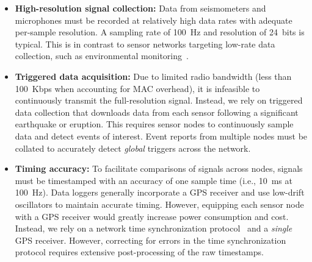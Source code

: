 \begin{itemize}

\item \textbf{High-resolution signal collection:} Data from seismometers and
microphones must be recorded at relatively high data rates with adequate
per-sample resolution. A sampling rate of 100~Hz and resolution of 24~bits is
typical. This is in contrast to sensor networks targeting low-rate data
collection, such as environmental
monitoring~\cite{gdi-sensys04,berkeley-redwoods}.

\item \textbf{Triggered data acquisition:} Due to limited radio bandwidth
(less than 100~Kbps when accounting for MAC overhead), it is infeasible to
continuously transmit the full-resolution signal. Instead, we rely on
triggered data collection that downloads data from each sensor following a
significant earthquake or eruption. This requires sensor nodes to
continuously sample data and detect events of interest. Event reports from
multiple nodes must be collated to accurately detect \textit{global} triggers
across the network.

\item \textbf{Timing accuracy:} To facilitate comparisons of signals across
nodes, signals must be timestamped with an accuracy of one sample time (i.e.,
10~ms at 100~Hz).  Data loggers generally incorporate a GPS receiver and use
low-drift oscillators to maintain accurate timing. However, equipping each
sensor node with a GPS receiver would greatly increase power consumption and
cost.  Instead, we rely on a network time synchronization
protocol~\cite{rbs,ftsp} and a \textit{single} GPS receiver. However,
correcting for errors in the time synchronization protocol requires extensive
post-processing of the raw timestamps.

\end{itemize}
